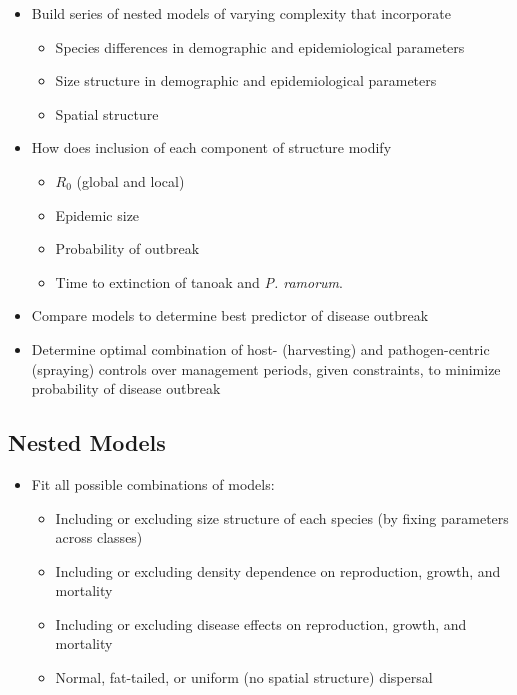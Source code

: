 \documentclass[english,nohyper,nofonts,nobib,nols,twoside]{tufte-handout}
\begin{document}
\begin{itemize}
\itemsep1pt\parskip0pt
\item
  Build series of nested models of varying complexity that incorporate

  \begin{itemize}
  \itemsep1pt\parskip0pt
  \item
    Species differences in demographic and epidemiological parameters
  \item
    Size structure in demographic and epidemiological parameters
  \item
    Spatial structure
  \end{itemize}
\item
  How does inclusion of each component of structure modify

  \begin{itemize}
  \itemsep1pt\parskip0pt
  \item
    $R_0$ (global and local)
  \item
    Epidemic size
  \item
    Probability of outbreak
  \item
    Time to extinction of tanoak and \emph{P. ramorum}.
  \end{itemize}
\item
  Compare models to determine best predictor of disease outbreak
\item
  Determine optimal combination of host- (harvesting) and
  pathogen-centric (spraying) controls over management periods, given
  constraints, to minimize probability of disease outbreak
\end{itemize}

\subsection{Nested Models}

\begin{itemize}
\itemsep1pt\parskip0pt
\item
  Fit all possible combinations of models:

  \begin{itemize}
  \itemsep1pt\parskip0pt
  \item
    Including or excluding size structure of each species (by fixing
    parameters across classes)
  \item
    Including or excluding density dependence on reproduction, growth,
    and mortality
  \item
    Including or excluding disease effects on reproduction, growth, and
    mortality
  \item
    Normal, fat-tailed, or uniform (no spatial structure) dispersal
  \end{itemize}
\end{itemize}
\end{document}

